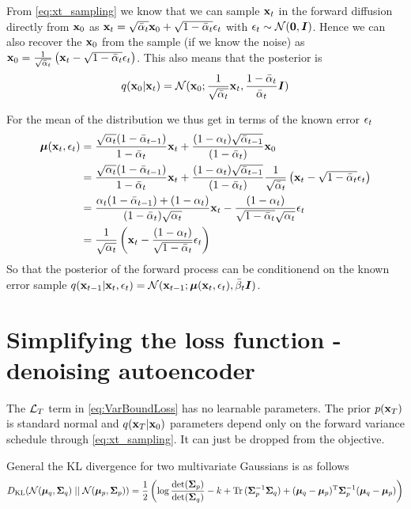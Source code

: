 From \eqref{eq:xt_sampling} we know that we can sample ${\mathbf{x}}_t$ in the forward diffusion directly from ${\mathbf{x}}_0$ as ${\mathbf{x}}_t = \sqrt{\bar{\alpha}_t} {\mathbf{x}}_0 + \sqrt{1 - \bar{\alpha}_t} {\mathbf{\epsilon}}_t$ with ${\mathbf{\epsilon}}_t \sim \mathcal{N}(\mathbf{0}, {\bm{I}})$. 
Hence we can also recover the ${\mathbf{x}}_0$ from the sample (if we know the noise) as 
${\mathbf{x}}_0 = \frac{1}{\sqrt{\bar{\alpha}_t}} \left( {\mathbf{x}}_t - \sqrt{1 - \bar{\alpha}_t} {\mathbf{\epsilon}}_t \right)$.
This also means that the posterior is
\begin{equation}\label{eq:x0_posterior}
    q({\mathbf{x}}_0 | {\mathbf{x}}_t) = \mathcal{N}({\mathbf{x}}_0 ; \frac{1}{\sqrt{\bar{\alpha}_t}}{\mathbf{x}}_t , \frac{1-\bar{\alpha}_t}{\bar{\alpha}_t}{\bm{I}})
\end{equation}

For the mean of the distribution we thus get in terms of the known error ${\mathbf{\epsilon}}_t$
\begin{align}\label{eq:forwardPosteriorEps}
    {\bm{\mu}}({\mathbf{x}}_t, {\mathbf{\epsilon}}_t) &= \frac{\sqrt{\alpha_t}(1 - \bar{\alpha}_{t-1})}{1 - \bar{\alpha}_t}{\mathbf{x}}_t
    + \frac{(1-\alpha_t)\sqrt{\bar{\alpha}_{t-1}}}{(1 - \bar{\alpha}_t)} {\mathbf{x}}_0 \nonumber \\
    &= \frac{\sqrt{\alpha_t}(1 - \bar{\alpha}_{t-1})}{1 - \bar{\alpha}_t}{\mathbf{x}}_t
    + \frac{(1-\alpha_t)\sqrt{\bar{\alpha}_{t-1}}}{(1 - \bar{\alpha}_t)}
    \frac{1}{\sqrt{\bar{\alpha}_t}} \left( {\mathbf{x}}_t - \sqrt{1 - \bar{\alpha}_t} {\mathbf{\epsilon}}_t  \right) \nonumber \\
    &= \frac{\alpha_t(1 - \bar{\alpha}_{t-1})+ (1 - \alpha_t)}{(1 - \bar{\alpha}_t)\sqrt{\alpha_t}}{\mathbf{x}}_t
    - \frac{(1-\alpha_t)}{\sqrt{1 - \bar{\alpha}_t}\sqrt{\alpha_t}}
    {\mathbf{\epsilon}}_t \nonumber \\
    &= \frac{1}{\sqrt{\alpha_t}} \left( 
        {\mathbf{x}}_t - \frac{(1-\alpha_t)}{\sqrt{1 - \bar{\alpha}_t}} {\mathbf{\epsilon}}_t
    \right)
\end{align}
So that the posterior of the forward process can be conditionend on the known error sample $q({\mathbf{x}}_{t-1} | {\mathbf{x}}_t, {\mathbf{\epsilon}}_t) = \mathcal{N}({\mathbf{x}}_{t-1}; {\bm{\mu}}({\mathbf{x}}_t, {\mathbf{\epsilon}}_t), \bar{\beta}_t {\bm{I}})$.

\section{Simplifying the loss function - denoising autoencoder}

The $\mathcal{L}_T$ term in \eqref{eq:VarBoundLoss} has no learnable parameters. 
The prior $p({\mathbf{x}}_T)$ is standard normal and $q({\mathbf{x}}_T | {\mathbf{x}}_0)$ parameters depend only on the forward variance schedule through \eqref{eq:xt_sampling}.
It can just be dropped from the objective.

General the KL divergence for two multivariate Gaussians is as follows
\begin{align*}
    D_{\mathrm{KL}}(\mathcal{N}({\bm{\mu}}_q, {\bm{\Sigma}}_q) \mid\mid \mathcal{N}({\bm{\mu}}_p, {\bm{\Sigma}}_p)) = 
    \frac{1}{2} \left( \log \frac{\det({\bm{\Sigma}}_p)}{\det({\bm{\Sigma}}_q)} - k + \operatorname{Tr} \, ({\bm{\Sigma}}_p^{-1} {\bm{\Sigma}}_q) + ({\bm{\mu}}_q - {\bm{\mu}}_p)^{\mathrm{T}} {\bm{\Sigma}}_p^{-1} ({\bm{\mu}}_q - {\bm{\mu}}_p) \right)
\end{align*}


